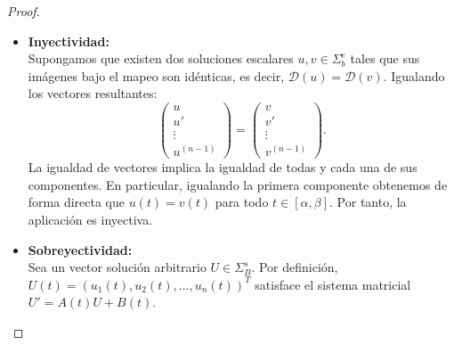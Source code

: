 \begin{proof}
\begin{itemize}
\[            + \begin{pmatrix} 0 \\ 0 \\ \vdots \\ 0 \\ b(t) \end{pmatrix}.
        \]
        Realizando el producto fila por columna:
        \[
            A(t) U(t) + B(t) = \begin{pmatrix} u' \\ u'' \\ \vdots \\ u^{(n-1)} \\ a_0(t) u + a_1(t) u' + \dots + a_{n-1}(t) u^{(n-1)} \end{pmatrix} + \begin{pmatrix} 0 \\ 0 \\ \vdots \\ 0 \\ b(t) \end{pmatrix} = U'(t).
        \]
        Como $U'(t) = A(t)U(t) + B(t)$, concluimos que $\mathcal{D}(u) \in \Sigma_B^s$, por lo que la aplicación está bien definida.
        \item \textbf{Inyectividad:} \\
        Supongamos que existen dos soluciones escalares $u, v \in \Sigma_b^e$ tales que sus imágenes bajo el mapeo son idénticas, es decir, $\mathcal{D}(u) = \mathcal{D}(v)$. Igualando los vectores resultantes:
        \[
            \begin{pmatrix} u \\ u' \\ \vdots \\ u^{(n-1)} \end{pmatrix} = \begin{pmatrix} v \\ v' \\ \vdots \\ v^{(n-1)} \end{pmatrix}.
        \]
        La igualdad de vectores implica la igualdad de todas y cada una de sus componentes. En particular, igualando la primera componente obtenemos de forma directa que $u(t) = v(t)$ para todo $t \in [\alpha, \beta]$. Por tanto, la aplicación es inyectiva.
        \item \textbf{Sobreyectividad:} \\
        Sea un vector solución arbitrario $U \in \Sigma_B^s$. Por definición, $U(t) = (u_1(t), u_2(t), \dots, u_n(t))^T$ satisface el sistema matricial $U' = A(t)U + B(t)$. 
        

\end{itemize}
\end{proof}
